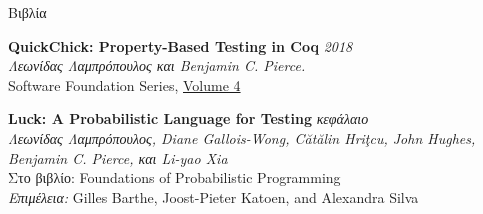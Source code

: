 \documentclass{resume} %
\begin{document}

\newcommand{\Catalin}{C\u{a}t\u{a}lin\xspace}
\newcommand{\Hritcu}{Hri\c{t}cu\xspace}
\newcommand{\Denes}{D\'en\`es\xspace}

\newcommand{\pub}[4]{
  {\bf #1} \hfill {\href{https://lemonidas.github.io/pdf/#2}{\bf \em #4}}\\
  {#3}
  }

\newcommand{\pubtwo}[6]{
  {\bf #1} \hfill {\href{https://lemonidas.github.io/pdf/#2}{\bf \em #4}}, {\href{https://lemonidas.github.io/pdf/#5}{\bf \em #6}}\\
  {#3}
  }

\newcommand{\pubsub}[5]{
  {\bf #1:} \hfill {\href{https://lemonidas.github.io/pdf/#2}{\bf \em #4}}\\
  {\bf #5}\\
  {#3}
  }

\begin{rSection}{\textgreek{Βιβλία}}

  {\bf QuickChick: Property-Based Testing in Coq} \hfill {\em 2018}\\
  {\em \textgreek{Λεωνίδας Λαμπρόπουλος και} Benjamin C. Pierce.}\\
  {Software Foundation Series, \href{https://softwarefoundations.cis.upenn.edu}{Volume 4}}

  {\bf Luck: A Probabilistic Language for Testing} \hfill {\em \textgreek{κεφάλαιο}}\\
  {\em \textgreek{Λεωνίδας Λαμπρόπουλος}, Diane Gallois-Wong, C\u{a}t\u{a}lin Hri\c{t}cu, John Hughes, Benjamin C. Pierce, \textgreek{και} Li-yao Xia}\\
  \textgreek{Στο βιβλίο}: {Foundations of Probabilistic Programming} \\
  {\em \textgreek{Επιμέλεια}:} {Gilles Barthe, Joost-Pieter Katoen, \textgreek{and} Alexandra Silva}\\

\clearpage
  
\end{rSection}
\end{document}
